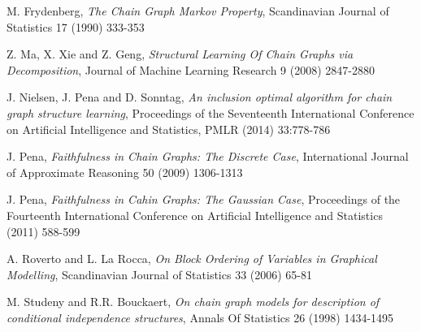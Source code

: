 \documentclass{pracamgr}
\theoremstyle{definition}
\begin{document}
\begin{thebibliography}{99}
	 M. Frydenberg, \textit{The Chain Graph Markov Property}, Scandinavian Journal of Statistics 17 (1990) 333-353	
	
	 Z. Ma, X. Xie and Z. Geng, \textit{Structural Learning Of Chain Graphs via Decomposition}, Journal of Machine Learning Research 9 (2008) 2847-2880

	 J. Nielsen, J. Pena and D. Sonntag, \textit{An inclusion optimal algorithm for chain graph structure learning}, Proceedings of the Seventeenth International
		Conference on Artificial Intelligence and Statistics, PMLR (2014) 33:778-786

	 J. Pena, \textit{Faithfulness in Chain Graphs: The Discrete Case}, International Journal of Approximate Reasoning 50 (2009) 1306-1313

	 J. Pena, \textit{Faithfulness in Cahin Graphs: The Gaussian Case}, Proceedings of the Fourteenth International Conference on Artificial Intelligence and Statistics (2011) 588-599

	 A. Roverto and L. La Rocca, \textit{On Block Ordering of Variables in Graphical Modelling}, Scandinavian Journal of Statistics 33 (2006) 65-81

	 M. Studeny and R.R. Bouckaert, \textit{On chain graph models for description of conditional independence structures}, Annals Of Statistics 26 (1998) 1434-1495
	
\end{thebibliography}
\end{document}

